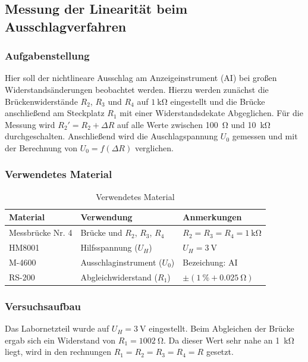 \newpage
\subsection{Messung der Linearität beim Ausschlagverfahren}\label{sec:1-4}
\subsubsection{Aufgabenstellung}

Hier soll der nichtlineare Ausschlag am Anzeigeinstrument (AI) bei großen Widerstandsänderungen beobachtet werden. Hierzu werden zunächst die Brückenwiderstände $R_2$, $R_3$ und $R_4$ auf $\SI{1}{\kilo\ohm}$ eingestellt und die Brücke anschließend am Steckplatz $R_1$ mit einer Widerstandsdekate Abgeglichen. Für die Messung wird $R_2'=R_2 + \Delta R$ auf alle Werte zwischen \SI{100}{\ohm} und \SI{10}{\kilo\ohm} durchgeschalten. Anschließend wird die Auschlagspannung $U_0$ gemessen und mit der Berechnung von $U_0 = f(\Delta R)$ verglichen.

\subsubsection{Verwendetes Material}

\begin{table}[h]
	\centering
	\caption{Verwendetes Material}
	\begin{tabularx}{\textwidth}{XXX}
		\textbf{Material} & \textbf{Verwendung}            & \textbf{Anmerkungen}                        \\ \midrule
		Messbrücke Nr. 4  & Brücke und $R_2$, $R_3$, $R_4$ & $R_2=R_3=R_4=\SI{1}{\kilo\ohm}$             \\
		HM8001            & Hilfsspannung ($U_H$)          & $U_H=\SI{3}{\volt}$                         \\
		M-4600            & Ausschlaginstrument ($U_0$)    & Bezeichung: AI                              \\
		RS-200            & Abgleichwiderstand ($R_1$)     & $\pm (\SI{1}{\percent} + \SI{0.025}{\ohm})$ \\
	\end{tabularx}
\end{table}

\subsubsection{Versuchsaufbau}

Das Labornetzteil wurde auf $U_H=\SI{3}{\volt}$ eingestellt. Beim Abgleichen der Brücke ergab sich ein Widerstand von $R_1=\SI{1002}{\ohm}$. Da dieser Wert sehr nahe an \SI{1}{\kilo\ohm} liegt, wird in den rechnungen $R_1 = R_2 = R_3 = R_4 = R$ gesetzt.

